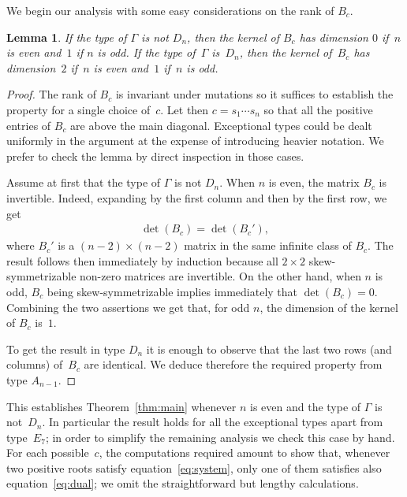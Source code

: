 \documentclass[pdftex]{sigma}
\numberwithin{equation}{section}
\newtheorem{Lemma}[Theorem]{Lemma}
\begin{document}
  We begin our analysis with some easy considerations on the rank of $B_c$.
  \begin{Lemma} \label{lem:dimensions}
    If the type of $\Gamma$ is not $D_n$, then the kernel of $B_c$ has dimension $0$ if~$n$ is even and~$1$ if $n$ is odd.
    If the type of~$\Gamma$ is~$D_n$, then the kernel of~$B_c$ has dimension~$2$ if~$n$ is even and~$1$ if~$n$ is odd.
  \end{Lemma}

  \begin{proof}
    The rank of $B_c$ is invariant under mutations so it suf\/f\/ices to establish the property for a single choice of~$c$.
    Let then $c=s_1\cdots s_n$ so that all the positive entries of $B_c$ are above the main diagonal.
    Exceptional types could be dealt uniformly in the argument at the expense of introducing heavier notation.
    We prefer to check the lemma by direct inspection in those cases.

    Assume at f\/irst that the type of $\Gamma$ is not $D_n$.
    When $n$ is even, the matrix $B_c$ is invertible.
    Indeed, expanding by the f\/irst column and then by the f\/irst row, we get
    \begin{gather*}
      \det(B_c)=\det(B_c'),
    \end{gather*}
    where $B_c'$ is a $(n-2)\times(n-2)$ matrix in the same inf\/inite class of $B_c$.
    The result follows then immediately by induction because all $2\times2$ skew-symmetrizable non-zero matrices are invertible.
    On the other hand, when $n$ is odd, $B_c$ being skew-symmetrizable implies immediately that $\det(B_c)=0$.
    Combining the two assertions we get that, for odd $n$, the dimension of the kernel of $B_c$ is~$1$.

    To get the result in type $D_n$ it is enough to observe that the last two rows (and columns) of~$B_c$ are identical.
    We deduce therefore the required property from type $A_{n-1}$.
  \end{proof}

  This establishes Theorem~\ref{thm:main} whenever $n$ is even and the type of $\Gamma$ is not~$D_n$.
  In particular the result holds for all the exceptional types apart from type~$E_7$; in order to simplify the remaining analysis we check this case by hand.
  For each possible~$c$, the computations required amount to show that, whenever two positive roots satisfy equation~\eqref{eq:system}, only one of them satisf\/ies also equation~\eqref{eq:dual}; we omit the straightforward but lengthy calculations.
\end{document}

